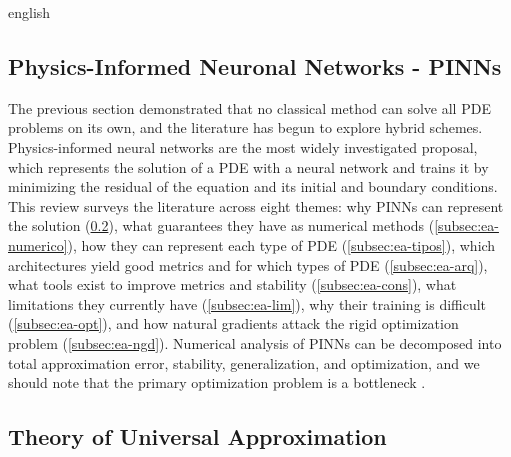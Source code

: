 \documentclass[../0000.tex]{subfiles}
\begin{document}
\begin{hyphenrules}{english}
\subsection{Physics-Informed Neuronal Networks - PINNs}
The previous section demonstrated that no classical method can solve all PDE problems on its own, and the literature has begun to explore hybrid schemes. 
Physics-informed neural networks are the most widely investigated proposal, which represents the solution of a PDE with a neural network and trains it by 
minimizing the residual of the equation and its initial and boundary conditions. This review surveys the literature across eight themes: why PINNs can represent 
the solution (\ref{subsec:ea-aprox}), what guarantees they have as numerical methods (\ref{subsec:ea-numerico}), how they can represent each type of PDE 
(\ref{subsec:ea-tipos}), which architectures yield good metrics and for which types of PDE (\ref{subsec:ea-arq}), what tools exist to improve metrics and 
stability (\ref{subsec:ea-cons}), what limitations they currently have (\ref{subsec:ea-lim}), why their training is difficult (\ref{subsec:ea-opt}), and how 
natural gradients attack the rigid optimization problem (\ref{subsec:ea-ngd}). Numerical analysis of PINNs can be decomposed into total approximation error, 
stability, generalization, and optimization, and we should note that the primary optimization problem is a bottleneck \cite{deryck2024acta}. 

\subsection{Theory of Universal Approximation}
\label{subsec:ea-aprox}


\end{hyphenrules}
\end{document}
